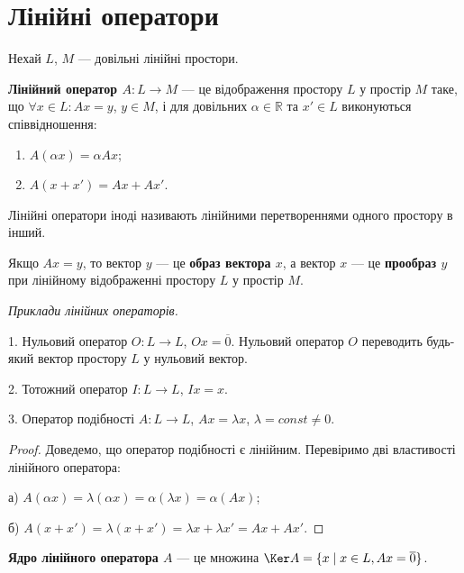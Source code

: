 \section{Лінійні оператори}

Нехай $L$, $M$ --- довільні лінійні простори.

\begin{definition}
	\textbf{Лінійний оператор $A: L \rightarrow M$} --- це відображення простору
	$L$ у простір $M$ таке, що $\forall x \in L: Ax = y$, $y \in M$, і для довільних $\alpha \in \mathbb{R}$ та $x' \in L$
	виконуються співвідношення: 
	\begin{enumerate}
		\item $A(\alpha x) = \alpha A x$;
		\item $A(x + x') = A x + A x'$.
	\end{enumerate}
\end{definition}

Лінійні оператори іноді називають лінійними перетвореннями одного
простору в інший.

\begin{definition}
	Якщо $Ax = y$, то вектор $y$ --- це \textbf{образ вектора $x$}, а вектор $x$
	--- це \textbf{прообраз $y$} при лінійному відображенні простору $L$ у простір $M$.
\end{definition}

\textit{Приклади лінійних операторів.}
\begin{example}
	1. Нульовий оператор $O: L \rightarrow L$, $Ox = \overline{0}$. Нульовий оператор $O$ переводить будь-який вектор простору $L$ у нульовий вектор.
	
	2. Тотожний оператор $I: L \rightarrow L$, $Ix = x$.

	3. Оператор подібності $A: L \rightarrow L$, $Ax = \lambda x$, $\lambda = const \neq 0$.
\end{example}

\begin{proof}
	Доведемо, що оператор подібності є лінійним. Перевіримо дві властивості лінійного оператора:
	
	а) $A(\alpha x) = \lambda(\alpha x) = \alpha(\lambda x) = \alpha(A x)$;

	б) $A(x + x') = \lambda(x + x') = \lambda x + \lambda x' = A x + A x'$.
\end{proof}

\begin{definition}
	\textbf{Ядро лінійного оператора $A$} --- це множина
	$\Ker A = \{x \mid x \in L, Ax = \overline{0}\}$.
\end{definition}

